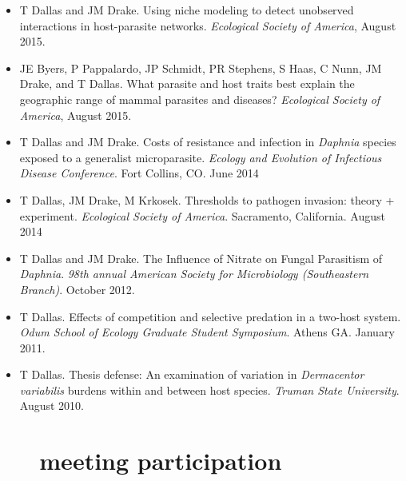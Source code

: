 \documentclass[]{CV}
\begin{document}
\begin{itemize}
\item {\mefont T Dallas} and JM Drake. Using niche modeling to detect unobserved interactions in host-parasite networks. \textit{Ecological Society of America}, August 2015.

\item JE Byers, P Pappalardo, JP Schmidt, PR Stephens, S Haas, C Nunn, JM Drake, and {\mefont T Dallas}. What parasite and host traits best explain the geographic range of mammal parasites and diseases? \textit{Ecological Society of America}, August  2015.

\item {\mefont T Dallas} and JM Drake. Costs of resistance and infection in \textit{Daphnia} species exposed to a generalist microparasite. \textit{Ecology and Evolution of Infectious Disease Conference}. Fort Collins, CO. June 2014

\item  {\mefont T Dallas}, JM Drake, M Krkosek. Thresholds to pathogen invasion: theory + experiment. \textit{Ecological Society of America}. Sacramento, California. August 2014

\item {\mefont T Dallas} and JM Drake. The Influence of Nitrate on Fungal Parasitism of \textit{Daphnia}. \textit{98th annual American Society for Microbiology (Southeastern Branch)}. October 2012.

\item {\mefont T Dallas}. Effects of competition and selective predation in a two-host system. \textit{Odum School of Ecology Graduate Student Symposium}. Athens GA. January 2011.

\item {\mefont T Dallas}. Thesis defense: An examination of variation in \textit{Dermacentor variabilis} burdens within and between host species. \textit{Truman State University}. August 2010.

\end{itemize}










\section{\faVideoCamera \ \ \ meeting participation}
\end{document}
